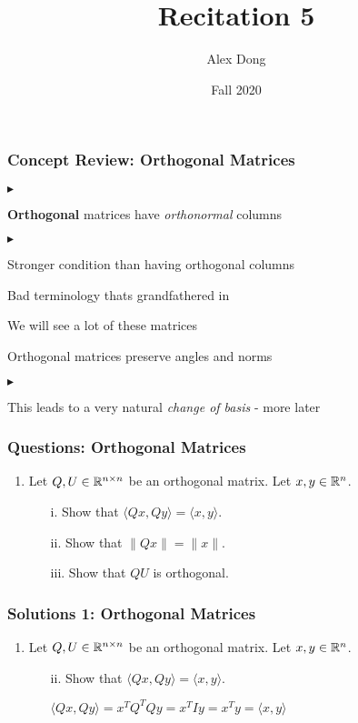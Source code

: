 \documentclass[table]{beamer}
\title{Recitation 5}
\author{Alex Dong}
\institute{CDS, NYU}
\date{Fall 2020}
\renewenvironment{itemize}
\renewenvironment{enumerate}%
{\begin{list}{\arabic{enumi}.}%
      {\setlength{\leftmargin}{2.5em}%
       \setlength{\itemsep}{-\parsep}%
       \setlength{\topsep}{-\parskip}%
       \usecounter{enumi}}%
 }{\end{list}}
\renewenvironment{itemize}%
{\begin{list}{$\blacktriangleright$}%
      {\setlength{\leftmargin}{2.5em}%
       \setlength{\itemsep}{-\parsep}%
       \setlength{\topsep}{-\parskip}%
       \usecounter{enumi}}%
 }{\end{list}}
\begin{document}
\frame{\titlepage} 

\begin{frame}
\frametitle{Concept Review: Orthogonal Matrices}
\begin{itemize}
\item \textbf{Orthogonal} matrices have \textit{orthonormal} columns
\begin{itemize}
\item Stronger condition than having orthogonal columns
\item Bad terminology thats grandfathered in
\end{itemize}
\item We will see a lot of these matrices
\item Orthogonal matrices preserve angles and norms
\begin{itemize}
\item This leads to a very natural \textit{change of basis} - more later
\end{itemize}
\end{itemize}
\end{frame}

\begin{frame}
\frametitle{Questions: Orthogonal Matrices}
\begin{enumerate}
\item Let $Q,U \in \mathbb{R}^{n \times n}$ be an orthogonal matrix. Let $x,y \in \mathbb{R}^n$.
\begin{enumerate}
\item[i.] Show that $\langle Qx, Qy \rangle = \langle x, y \rangle.$ 
\item[ii.] Show that $\|Qx\| = \|x\|.$
\item[iii.] Show that $QU$ is orthogonal.
\end{enumerate}
\end{enumerate}
\end{frame}


\begin{frame}
\frametitle{Solutions 1: Orthogonal Matrices}
\begin{enumerate}
\item Let $Q,U \in \mathbb{R}^{n \times n}$ be an orthogonal matrix. Let $x,y \in \mathbb{R}^n$.
\begin{enumerate}
\item[ii.]  Show that $\langle Qx, Qy \rangle = \langle x, y \rangle.$
\begin{solution}
$\langle Qx, Qy \rangle = x^TQ^TQy = x^T I y = x^Ty = \langle x, y \rangle$

\end{solution}
\end{enumerate}
\end{enumerate}
\end{frame}
\end{document}
